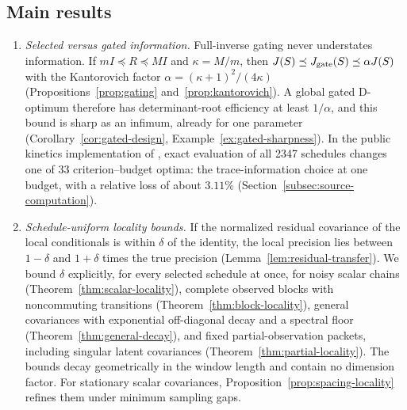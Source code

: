 \subsection{Main results}\label{subsec:intro-results}

\begin{enumerate}
\item \emph{Selected versus gated information.} Full-inverse gating never
understates information. If $mI\preceq R\preceq MI$ and $\kappa=M/m$,
then $J(S)\preceq J_{\mathrm{gate}}(S)\preceq\alpha J(S)$ with the Kantorovich
factor $\alpha=(\kappa+1)^2/(4\kappa)$
(Propositions~\ref{prop:gating} and~\ref{prop:kantorovich}). A global
gated D-optimum therefore has determinant-root efficiency at least
$1/\alpha$, and this bound is sharp as an infimum, already for one
parameter (Corollary~\ref{cor:gated-design},
Example~\ref{ex:gated-sharpness}). In the public kinetics implementation of
\citet{Wang2024}, exact evaluation of all 2347 schedules changes one of 33
criterion--budget optima: the trace-information choice at one budget, with
a relative loss of about $3.11\%$ (Section~\ref{subsec:source-computation}).

\item \emph{Schedule-uniform locality bounds.} If the normalized residual
covariance of the local conditionals is within $\delta$ of the identity, the
local precision lies between $1-\delta$ and $1+\delta$ times the true
precision (Lemma~\ref{lem:residual-transfer}). We bound $\delta$
explicitly, for every selected schedule at once, for noisy scalar chains
(Theorem~\ref{thm:scalar-locality}), complete observed blocks with
noncommuting transitions (Theorem~\ref{thm:block-locality}), general
covariances with exponential off-diagonal decay and a spectral floor
(Theorem~\ref{thm:general-decay}), and fixed partial-observation packets,
including singular latent covariances (Theorem~\ref{thm:partial-locality}).
The bounds decay geometrically in the window length and contain no
dimension factor. For stationary scalar covariances,
Proposition~\ref{prop:spacing-locality} refines them under minimum
sampling gaps.


\end{enumerate}
